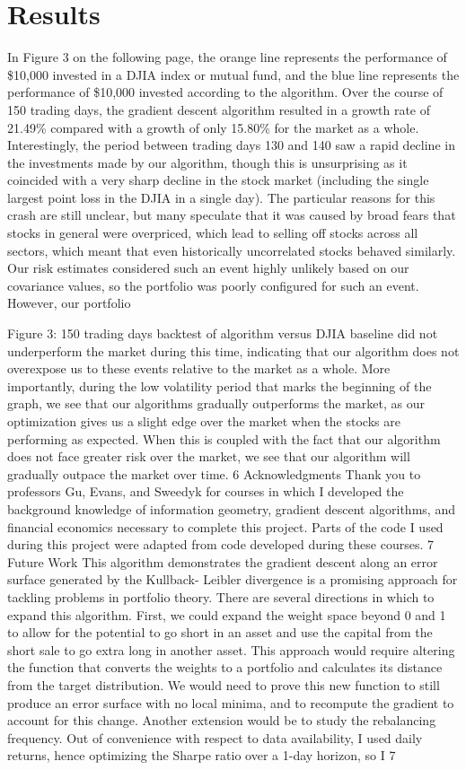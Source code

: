 \documentclass{article}
\begin{document}
\section{Results}
In Figure 3 on the following page, the orange line represents the performance of \$10,000 invested in a DJIA index or mutual fund, and the blue line represents the performance of \$10,000 invested according to the algorithm.
Over the course of 150 trading days, the gradient descent algorithm resulted in a growth rate of 21.49\% compared with a growth of only 15.80\% for the market as a whole. Interestingly, the period between trading days 130 and 140 saw a rapid decline in the investments made by our algorithm, though this is unsurprising as it coincided with a very sharp decline in the stock market (including the single largest point loss in the DJIA in a single day). The particular reasons for this crash are still unclear, but many speculate that it was caused by broad fears that stocks in general were overpriced, which lead to selling off stocks across all sectors, which meant that even historically uncorrelated stocks behaved similarly. Our risk estimates considered such an event highly unlikely based on our covariance values, so the portfolio was poorly configured for such an event. However, our portfolio


 Figure 3: 150 trading days backtest of algorithm versus DJIA baseline
did not underperform the market during this time, indicating that our algorithm does not overexpose us to these events relative to the market as a whole.
More importantly, during the low volatility period that marks the beginning of the graph, we see that our algorithms gradually outperforms the market, as our optimization gives us a slight edge over the market when the stocks are performing as expected. When this is coupled with the fact that our algorithm does not face greater risk over the market, we see that our algorithm will gradually outpace the market over time.
6 Acknowledgments
Thank you to professors Gu, Evans, and Sweedyk for courses in which I developed the background knowledge of information geometry, gradient descent algorithms, and financial economics necessary to complete this project. Parts of the code I used during this project were adapted from code developed during these courses.
7 Future Work
This algorithm demonstrates the gradient descent along an error surface generated by the Kullback- Leibler divergence is a promising approach for tackling problems in portfolio theory. There are several directions in which to expand this algorithm.
First, we could expand the weight space beyond 0 and 1 to allow for the potential to go short in an asset and use the capital from the short sale to go extra long in another asset. This approach would require altering the function that converts the weights to a portfolio and calculates its distance from the target distribution. We would need to prove this new function to still produce an error surface with no local minima, and to recompute the gradient to account for this change.
Another extension would be to study the rebalancing frequency. Out of convenience with respect to data availability, I used daily returns, hence optimizing the Sharpe ratio over a 1-day horizon, so I
7
\end{document}
